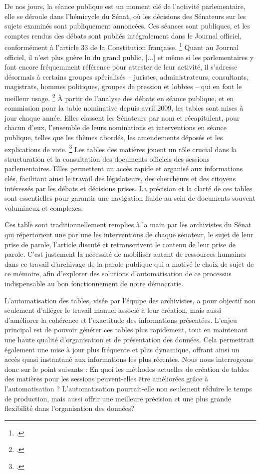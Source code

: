 De nos jours, la séance publique est un moment clé de l’activité parlementaire, elle se déroule dans l’hémicycle du Sénat, où les décisions des Sénateurs sur les sujets examinés sont publiquement annoncées. Ces séances sont publiques, et les comptes rendus des débats sont publiés intégralement dans le Journal oﬀiciel, conformément à l’article 33 de la Constitution française. \footcite{article33}
Quant au Journal oﬀiciel, il n’est plus guère lu du grand public, [...] et même si les parlementaires y font encore fréquemment référence pour attester de leur activité, il s’adresse désormais à certains groupes spécialisés – juristes, administrateurs, consultants, magistrats, hommes politiques, groupes de pression et lobbies – qui en font le meilleur usage. \footcite{HistoireSeance}
À partir de l’analyse des débats en séance publique, et en commission pour la table nominative depuis avril 2009, les tables sont mises à jour chaque année. Elles classent les Sénateurs par nom et récapitulent, pour chacun d’eux, l’ensemble de leurs nominations et interventions en séance publique, telles que les thèmes abordés, les amendements déposés et les explications de vote. \footcite{HistoireSeance}
Les tables des matières jouent un rôle crucial dans la structuration et la consultation des documents oﬀiciels des sessions parlementaires. Elles permettent un accès rapide et organisé aux informations clés, facilitant ainsi le travail des législateurs, des chercheurs et des citoyens intéressés par les débats et décisions prises. La précision et la clarté de ces tables sont essentielles pour garantir une navigation fluide au sein de documents souvent volumineux et complexes.

Ces table sont traditionnellement remplies à la main par les archivistes du Sénat qui répertorient une par une les interventions de chaque sénateur, le sujet de leur prise de parole, l'article discuté et retranscrivent le contenu de leur prise de parole.
C’est justement la nécessité de mobiliser autant de ressources humaines dans ce travail d'archivage de la parole publique qui a motivé le choix de sujet de ce mémoire, afin d’explorer des solutions d’automatisation de ce processus indispensable au bon fonctionnement de notre démocratie.

L’automatisation des tables, visée par l’équipe des archivistes, a pour objectif non seulement d’alléger le travail manuel associé à leur création, mais aussi d’améliorer la cohérence et l’exactitude des informations présentées. L’enjeu principal est de pouvoir générer ces tables plus rapidement, tout en maintenant une haute qualité d’organisation et de présentation des données. Cela permettrait également une mise à jour plus fréquente et plus dynamique, offrant ainsi un accès quasi instantané aux informations les plus récentes.
Nous nous interrogeons donc sur le point suivants :  En quoi les méthodes actuelles de création de tables des matières pour les sessions peuvent-elles être améliorées grâce à l’automatisation ? L’automatisation pourrait-elle non seulement réduire le temps de production, mais aussi
offrir une meilleure précision et une plus grande flexibilité dans l’organisation des données? 

